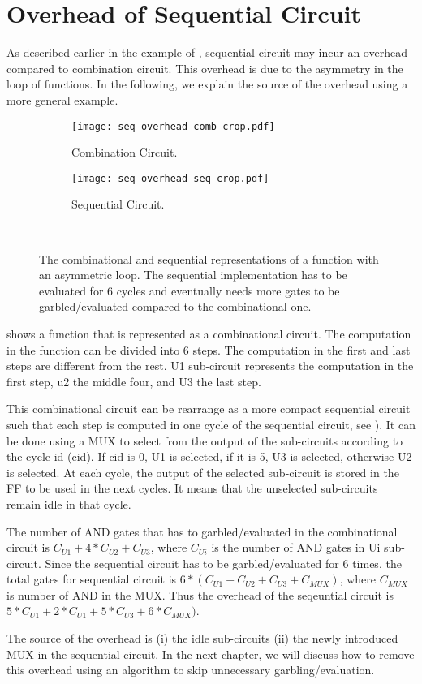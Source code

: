 \section{Overhead of Sequential Circuit}
As described earlier in the example of , sequential circuit may incur an overhead compared to combination circuit.
This overhead is due to the asymmetry in the loop of functions.
In the following, we explain the source of the overhead using a more general example.

\begin{figure}[ht]
    \centering
    \begin{subfigure}[t]{0.8\textwidth}
        \texttt{[image: seq-overhead-comb-crop.pdf]}
        \caption{Combination Circuit.}\label{fig:seq-overhead-comb}
    \end{subfigure}
    \begin{subfigure}[t]{0.7\textwidth}
        \texttt{[image: seq-overhead-seq-crop.pdf]}
        \caption{Sequential Circuit.}\label{fig:seq-overhead-seq}
    \end{subfigure}\\
    \caption{The combinational and sequential representations of a function with an asymmetric loop.
    The sequential implementation has to be evaluated for 6 cycles and eventually needs more gates to be garbled/evaluated compared to the combinational one.}\label{fig:fig:seq-overhead-comb}
\end{figure}

 shows a function that is represented as a combinational circuit.
The computation in the function can be divided into 6 steps.
The computation in the first and last steps are different from the rest.
U1 sub-circuit represents the computation in the first step, u2 the middle four, and U3 the last step.

This combinational circuit can be rearrange as a more compact sequential circuit such that each step is computed in one cycle of the sequential circuit, see ).
It can be done using a MUX to select from the output of the sub-circuits according to the cycle id (cid).
If cid is 0, U1 is selected, if it is 5, U3 is selected, otherwise U2 is selected.
At each cycle, the output of the selected sub-circuit is stored in the FF to be used in the next cycles.
It means that the unselected sub-circuits remain idle in that cycle.

The number of AND gates that has to garbled/evaluated in the combinational circuit is $C_{U1}+4*C_{U2}+C_{U3}$, where $C_{Ui}$ is the number of AND gates in Ui sub-circuit.
Since the sequential circuit has to be garbled/evaluated for 6 times, the total gates for sequential circuit is $6*(C_{U1}+C_{U2}+C_{U3}+C_{MUX})$, where $C_{MUX}$ is number of AND in the MUX.
Thus the overhead of the seqeuntial circuit is $5*C_{U1}+2*C_{U1}+5*C_{U3}+6*C_{MUX})$.

The source of the overhead is (i) the idle sub-circuits (ii) the newly introduced MUX in the sequential circuit.
In the next chapter, we will discuss how to remove this overhead using an algorithm to skip unnecessary garbling/evaluation.
